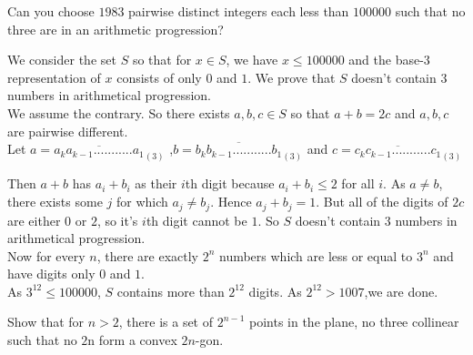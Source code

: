 \documentclass{subfile}
\begin{document}
		\begin{problem}
			Can you choose $1983$ pairwise distinct integers each less than $100000$ such that no three are in an arithmetic progression?
		\end{problem}
		
		\begin{solution}
		    We consider the set $S$ so that for $x\in S$, we have $x\leq 100000$ and the base-$3$ representation of $x$ consists of only $0$ and $1$. We prove that $S$ doesn't contain $3$ numbers in arithmetical progression.\\

            We assume the contrary. So there exists $a,b,c\in S$ so that $a+b=2c$ and $a,b,c$ are pairwise different.\\
            
            Let $a=\overline{a_ka_{k-1}...........a_1}_{(3)}$ ,$b=\overline{b_kb_{k-1}...........b_1}_{(3)}$ and $c=\overline{c_kc_{k-1}...........c_1}_{(3)}$
            
            Then $a+b$ has $a_i+b_i$ as their $i$th digit because $a_i+b_i\leq 2$ for all $i$. As $a\neq b$, there exists some $j$ for which $a_j\neq b_j$. Hence $a_j+b_j=1$. But all of the digits of $2c$ are either $0$ or $2$, so it's $i$th digit cannot be $1$. So $S$ doesn't contain $3$ numbers in arithmetical progression.\\
            
            Now for every $n$, there are exactly $2^n$ numbers which are less or equal to $3^n$ and have digits only $0$ and $1$.\\
            
            
            As $3^{12}\leq 100000$, $S$ contains more than $2^{12}$ digits. As $2^{12}>1007$,we are done.
		\end{solution}
		
		\begin{problem}
			Show that for $n>2$, there is a set of $2^{n-1}$ points in the plane, no three collinear such that no $2$n form a convex $2n$-gon.
		\end{problem}
		
\end{document}
